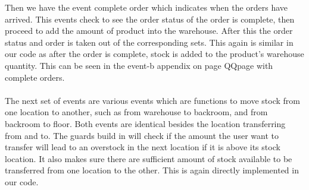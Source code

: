 \documentclass[a4paper]{article}
\begin{document}
Then we have the event complete order which indicates when the orders have arrived. This events check to see the order status of the order is complete, then proceed to add the amount of product into the warehouse. After this the order status and order is taken out of the corresponding sets. This again is similar in our code as after the order is complete, stock is added to the product’s warehouse quantity. This can be seen in the event-b appendix on page QQpage with complete orders. 
\\\\
The next set of events are various events which are functions to move stock from one location to another, such as from warehouse to backroom, and from backroom to floor. Both events are identical besides the location transferring from and to. The guards build in will check if the amount the user want to transfer will lead to an overstock in the next location if it is above its stock location. It also makes sure there are sufficient amount of stock available to be transferred from one location to the other. This is again directly implemented in our code. 
\\\\
\end{document}
